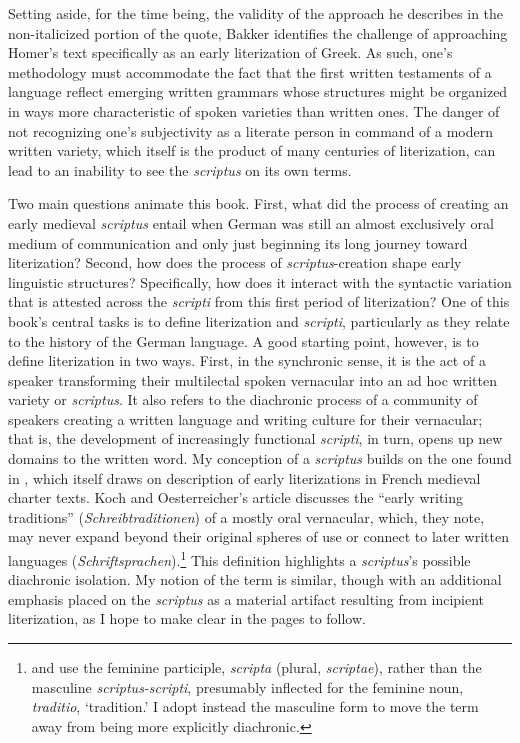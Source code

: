 \noindent Setting aside, for the time being, the validity of the approach he describes in the non-italicized portion of the quote, Bakker identifies the challenge of approaching Homer’s text specifically as an early literization of Greek. As such, one’s methodology must accommodate the fact that the first written testaments of a language reflect emerging written grammars whose structures might be organized in ways more characteristic of spoken varieties than written ones. The danger of not recognizing one’s subjectivity as a literate person in command of a modern written variety, which itself is the product of many centuries of literization, can lead to an inability to see the \textit{scriptus} on its own terms. 

Two main questions animate this book. First, what did the process of creating an early medieval \textit{scriptus} entail when German was still an almost exclusively oral medium of communication and only just beginning its long journey toward literization? Second, how does the process of \textit{scriptus}{}-creation shape early linguistic structures? Specifically, how does it interact with the syntactic variation that is attested across the \textit{scripti} from this first period of literization? One of this book’s central tasks is to define literization and \textit{scripti}, particularly as they relate to the history of the German language. A good starting point, however, is to define literization in two ways. First, in the synchronic sense, it is the act of a speaker transforming their multilectal spoken vernacular into an ad hoc written variety or \textit{scriptus}. It also refers to the diachronic process of a community of speakers creating a written language and writing culture for their vernacular; that is, the development of increasingly functional \textit{scripti}, in turn, opens up new domains to the written word. My conception of a \textit{scriptus} builds on the one found in \citet[596--597]{KochOesterreicher1994}, which itself draws on  description of early literizations in French medieval charter texts. Koch and Oesterreicher’s article discusses the “early writing traditions” (\textit{Schreibtraditionen}) of a mostly oral vernacular, which, they note, may never expand beyond their original spheres of use or connect to later written languages (\textit{Schriftsprachen}).\footnote{{\citet{KochOesterreicher1994} and \citet{Gossen1967} use the feminine participle,} {\textit{scripta}} {(plural,} {\textit{scriptae}}{), rather than the masculine} {\textit{scriptus-scripti}}{, presumably inflected for the feminine noun,} {\textit{traditio}}{, ‘tradition.’ I adopt instead the masculine form to move the term away from being more explicitly diachronic.}} This definition highlights a \textit{scriptus}’s possible diachronic isolation. My notion of the term is similar, though with an additional emphasis placed on the \textit{scriptus} as a material artifact resulting from incipient literization, as I hope to make clear in the pages to follow.

